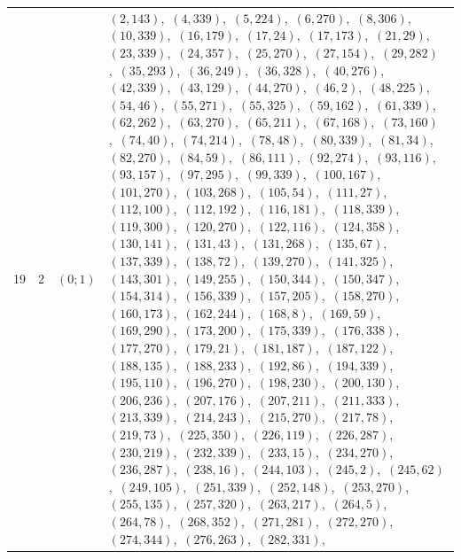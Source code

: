 \documentclass[11pt]{article}
\begin{document}
\begin{longtable}{@{}rrl>{\raggedright\arraybackslash}p{}@{}}
19 & 2 & $(0;1)$ & $(2,143)$,\allowbreak\ $(4,339)$,\allowbreak\ $(5,224)$,\allowbreak\ $(6,270)$,\allowbreak\ $(8,306)$,\allowbreak\ $(10,339)$,\allowbreak\ $(16,179)$,\allowbreak\ $(17,24)$,\allowbreak\ $(17,173)$,\allowbreak\ $(21,29)$,\allowbreak\ $(23,339)$,\allowbreak\ $(24,357)$,\allowbreak\ $(25,270)$,\allowbreak\ $(27,154)$,\allowbreak\ $(29,282)$,\allowbreak\ $(35,293)$,\allowbreak\ $(36,249)$,\allowbreak\ $(36,328)$,\allowbreak\ $(40,276)$,\allowbreak\ $(42,339)$,\allowbreak\ $(43,129)$,\allowbreak\ $(44,270)$,\allowbreak\ $(46,2)$,\allowbreak\ $(48,225)$,\allowbreak\ $(54,46)$,\allowbreak\ $(55,271)$,\allowbreak\ $(55,325)$,\allowbreak\ $(59,162)$,\allowbreak\ $(61,339)$,\allowbreak\ $(62,262)$,\allowbreak\ $(63,270)$,\allowbreak\ $(65,211)$,\allowbreak\ $(67,168)$,\allowbreak\ $(73,160)$,\allowbreak\ $(74,40)$,\allowbreak\ $(74,214)$,\allowbreak\ $(78,48)$,\allowbreak\ $(80,339)$,\allowbreak\ $(81,34)$,\allowbreak\ $(82,270)$,\allowbreak\ $(84,59)$,\allowbreak\ $(86,111)$,\allowbreak\ $(92,274)$,\allowbreak\ $(93,116)$,\allowbreak\ $(93,157)$,\allowbreak\ $(97,295)$,\allowbreak\ $(99,339)$,\allowbreak\ $(100,167)$,\allowbreak\ $(101,270)$,\allowbreak\ $(103,268)$,\allowbreak\ $(105,54)$,\allowbreak\ $(111,27)$,\allowbreak\ $(112,100)$,\allowbreak\ $(112,192)$,\allowbreak\ $(116,181)$,\allowbreak\ $(118,339)$,\allowbreak\ $(119,300)$,\allowbreak\ $(120,270)$,\allowbreak\ $(122,116)$,\allowbreak\ $(124,358)$,\allowbreak\ $(130,141)$,\allowbreak\ $(131,43)$,\allowbreak\ $(131,268)$,\allowbreak\ $(135,67)$,\allowbreak\ $(137,339)$,\allowbreak\ $(138,72)$,\allowbreak\ $(139,270)$,\allowbreak\ $(141,325)$,\allowbreak\ $(143,301)$,\allowbreak\ $(149,255)$,\allowbreak\ $(150,344)$,\allowbreak\ $(150,347)$,\allowbreak\ $(154,314)$,\allowbreak\ $(156,339)$,\allowbreak\ $(157,205)$,\allowbreak\ $(158,270)$,\allowbreak\ $(160,173)$,\allowbreak\ $(162,244)$,\allowbreak\ $(168,8)$,\allowbreak\ $(169,59)$,\allowbreak\ $(169,290)$,\allowbreak\ $(173,200)$,\allowbreak\ $(175,339)$,\allowbreak\ $(176,338)$,\allowbreak\ $(177,270)$,\allowbreak\ $(179,21)$,\allowbreak\ $(181,187)$,\allowbreak\ $(187,122)$,\allowbreak\ $(188,135)$,\allowbreak\ $(188,233)$,\allowbreak\ $(192,86)$,\allowbreak\ $(194,339)$,\allowbreak\ $(195,110)$,\allowbreak\ $(196,270)$,\allowbreak\ $(198,230)$,\allowbreak\ $(200,130)$,\allowbreak\ $(206,236)$,\allowbreak\ $(207,176)$,\allowbreak\ $(207,211)$,\allowbreak\ $(211,333)$,\allowbreak\ $(213,339)$,\allowbreak\ $(214,243)$,\allowbreak\ $(215,270)$,\allowbreak\ $(217,78)$,\allowbreak\ $(219,73)$,\allowbreak\ $(225,350)$,\allowbreak\ $(226,119)$,\allowbreak\ $(226,287)$,\allowbreak\ $(230,219)$,\allowbreak\ $(232,339)$,\allowbreak\ $(233,15)$,\allowbreak\ $(234,270)$,\allowbreak\ $(236,287)$,\allowbreak\ $(238,16)$,\allowbreak\ $(244,103)$,\allowbreak\ $(245,2)$,\allowbreak\ $(245,62)$,\allowbreak\ $(249,105)$,\allowbreak\ $(251,339)$,\allowbreak\ $(252,148)$,\allowbreak\ $(253,270)$,\allowbreak\ $(255,135)$,\allowbreak\ $(257,320)$,\allowbreak\ $(263,217)$,\allowbreak\ $(264,5)$,\allowbreak\ $(264,78)$,\allowbreak\ $(268,352)$,\allowbreak\ $(271,281)$,\allowbreak\ $(272,270)$,\allowbreak\ $(274,344)$,\allowbreak\ $(276,263)$,\allowbreak\ $(282,331)$,\allowbreak\ 
\end{longtable}
\end{document}
